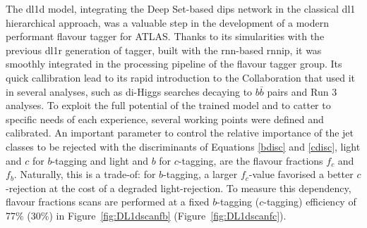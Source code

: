 The \gls{dl1d} model, integrating the Deep Set-based \gls{dips} network in the classical \gls{dl1} hierarchical approach, was a valuable step in the development of a modern performant flavour tagger for ATLAS. Thanks to its simularities with the previous \gls{dl1r} generation of tagger, built with the \gls{rnn}-based \gls{rnnip}, it was smoothly integrated in the processing pipeline of the flavour tagger group. Its quick callibration lead to its rapid introduction to the Collaboration that used it in several analyses, such as di-Higgs searches decaying to $b\bar{b}$ pairs and Run 3 analyses. To exploit the full potential of the trained model and to catter to specific needs of each experience, several working points were defined and calibrated. An important parameter to control the relative importance of the jet classes to be rejected with the discriminants of Equations \ref{bdisc} and \ref{cdisc}, light and $c$ for $b$-tagging and light and $b$ for $c$-tagging, are the flavour fractions $f_c$ and $f_b$. Naturally, this is a trade-of: for $b$-tagging, a larger $f_c$-value favorised a better $c$-rejection at the cost of a degraded light-rejection. To measure this dependency, flavour fractions scans are performed at a fixed $b$-tagging ($c$-tagging) efficiency of 77\% (30\%) in Figure~\ref{fig:DL1dscanfb} (Figure~\ref{fig:DL1dscanfc}). %

